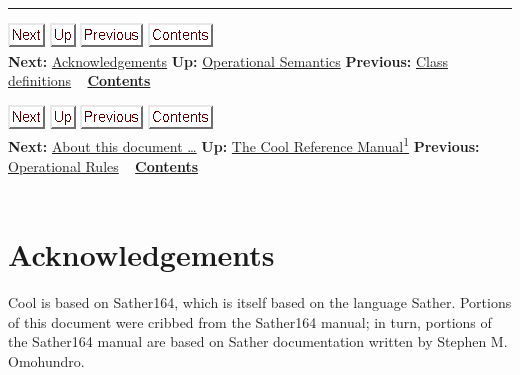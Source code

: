 \documentclass[]{article}
\begin{document}
\begin{center}\rule{3in}{0.4pt}\end{center}

\href{node49.html}{\includegraphics{next.png}}
\href{node44.html}{\includegraphics{up.png}}
\href{node47.html}{\includegraphics{prev.png}}
\href{node1.html}{\includegraphics{contents.png}} \\ \textbf{Next:}
\href{node49.html}{Acknowledgements} \textbf{Up:}
\href{node44.html}{Operational Semantics} \textbf{Previous:}
\href{node47.html}{Class definitions} ~
\textbf{\href{node1.html}{Contents}}

\href{node50.html}{\includegraphics{next.png}}
\href{cool-manual.html}{\includegraphics{up.png}}
\href{node48.html}{\includegraphics{prev.png}}
\href{node1.html}{\includegraphics{contents.png}} \\ \textbf{Next:}
\href{node50.html}{About this document \ldots{}} \textbf{Up:}
\href{cool-manual.html}{The Cool Reference Manual\textsuperscript{1}}
\textbf{Previous:} \href{node48.html}{Operational Rules} ~
\textbf{\href{node1.html}{Contents}} \\ \\

\section{Acknowledgements}

Cool is based on Sather164, which is itself based on the language
Sather. Portions of this document were cribbed from the Sather164
manual; in turn, portions of the Sather164 manual are based on Sather
documentation written by Stephen M. Omohundro.
\end{document}
